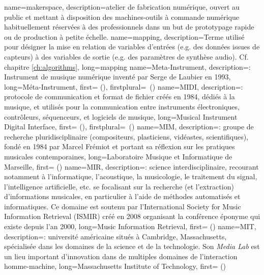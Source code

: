 {
    name={makerspace},
    description={atelier de fabrication numérique, ouvert au public et mettant à disposition des machines-outils à commande numérique habituellement réservées à des professionnels dans un but de prototypage rapide ou de production à petite échelle.}
}
{
    name={mapping},
    description={Terme utilisé pour désigner la mise en relation de variables d'entrées (e.g. des données issues de capteurs) à des variables de sortie (e.g. des paramètres de synthèse audio). Cf. chapitre \ref{ch:algorithms}},
    long={mapping}
}
{
    name={Meta-Instrument},
    description={\textit{}: Instrument de musique numérique inventé par Serge de Laubier en 1993},
    long={Méta-Instrument},
    first={ ()},
    firstplural={\glspluralsuffix\ (\glspluralsuffix)}
}
{
    name={MIDI},
    description={\textit{}: protocole de communication et format de fichier créés en 1984, dédiés à la musique, et utilisés pour la communication entre instruments électroniques, contrôleurs, séquenceurs, et logiciels de musique},
    long={Musical Instrument Digital Interface},
   	first={ ()},
    firstplural={\glspluralsuffix\ (\glspluralsuffix)}
}
{
    name={MIM},
    description={\textit{}: groupe de recherche pluridisciplinaire (compositeurs, plasticiens, vidéastes, scientifiques), fondé en 1984 par Marcel Frémiot et portant sa réflexion sur les pratiques musicales contemporaines},
    long={Laboratoire Musique et Informatique de Marseille},
    first={ ()}
}
{
    name={MIR},
    description={\textit{}: science interdisciplinaire, recourant notamment à l'informatique, l'acoustique, la musicologie, le traitement du signal, l'intelligence artificielle, etc. se focalisant sur la recherche (et l'extraction) d'informations musicales, en particulier à l'aide de méthodes automatisés et informatiques. Ce domaine est soutenu par l'International Society for Music Information Retrieval (ISMIR) créé en 2008 organisant la conférence éponyme qui existe depuis l'an 2000},
    long={Music Information Retrieval},
    first={ ()}
}
{
    name={MIT},
    description={\textit{}: université américaine situés à Cambridge, Massachusetts, spécialisée dans les domaines de la science et de la technologie. Son \textit{Media Lab} est un lieu important d'innovation dans de multiples domaines de l'interaction homme-machine},
    long={Massachusetts Institute of Technology},
    first={ ()}
}

